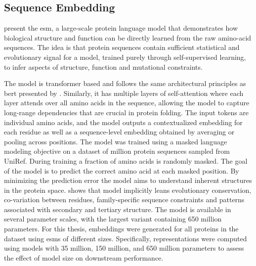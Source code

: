 \subsection{Sequence Embedding}\label{sec:methods/feature_engineering/sequence_embedding}

\textcite{Rives2021} present the \gls{esm}, a large-scale protein language model that demonstrates how biological structure and function can be directly learned from the raw amino-acid sequences. The idea is that protein sequences contain sufficient statistical and evolutionary signal for a model, trained purely through self-supervised learning, to infer aspects of structure, function and mutational constraints. 

The model is transformer based and follows the same architectural principles as \gls{bert} presented by \textcite{Devlin2019}. Similarly, it has multiple layers of self-attention where each layer attends over all amino acids in the sequence, allowing the model to capture long-range dependencies that are crucial in protein folding. The input tokens are individual amino acids, and the model outputs a contextualized embedding for each residue as well as a sequence-level embedding obtained by averaging or pooling across positions. 
The model was trained using a masked language modeling objective on a dataset of  million protein sequences sampled from UniRef. During training a fraction of amino acids is randomly masked. The goal of the model is to predict the correct amino acid at each masked position. By minimizing the prediction error the model aims to understand inherent structures in the protein space. 
\textcite{Rives2021} shows that model implicitly leans evolutionary conservation, co-variation between residues, family-specific sequence constraints and patterns associated with secondary and tertiary structure. 
The model is available in several parameter scales, with the largest variant containing 650 million parameters. For this thesis, embeddings were generated for all proteins in the dataset using \glspl{esm} of different sizes. Specifically, representations were computed using models with 35 million, 150 million, and 650 million parameters to assess the effect of model size on downstream performance.

